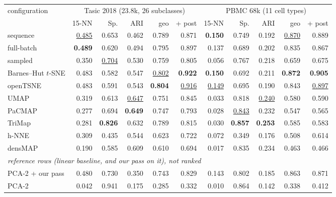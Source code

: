 \begin{tabular}{lrrrrrrrrrr}
\toprule
configuration & \multicolumn{5}{c}{Tasic 2018 (23.8k, 26 subclasses)} & \multicolumn{5}{c}{PBMC 68k (11 cell types)} \\
 & 15-NN & Sp. & ARI & geo & + post & 15-NN & Sp. & ARI & geo & + post \\
\midrule
\magnet{} sequence & \underline{0.485} & 0.653 & 0.462 & 0.789 & 0.871 & \textbf{0.150} & 0.749 & 0.192 & \underline{0.870} & 0.889 \\
\magnet{} full-batch & \textbf{0.489} & 0.620 & 0.494 & 0.795 & 0.897 & 0.137 & 0.689 & 0.202 & 0.835 & 0.867 \\
\magnet{} sampled & 0.350 & \underline{0.704} & 0.530 & 0.759 & 0.805 & 0.056 & 0.767 & 0.218 & 0.659 & 0.675 \\
Barnes--Hut $t$-SNE & 0.483 & 0.582 & 0.547 & \underline{0.802} & \textbf{0.922} & \textbf{0.150} & 0.692 & 0.211 & \textbf{0.872} & \textbf{0.905} \\
openTSNE & 0.483 & 0.591 & 0.543 & \textbf{0.804} & \underline{0.916} & \underline{0.149} & 0.695 & 0.190 & 0.843 & \underline{0.897} \\
UMAP & 0.319 & 0.613 & \underline{0.647} & 0.751 & 0.845 & 0.033 & 0.818 & \underline{0.240} & 0.580 & 0.590 \\
PaCMAP & 0.277 & 0.694 & \textbf{0.649} & 0.747 & 0.793 & 0.028 & \underline{0.843} & 0.232 & 0.547 & 0.565 \\
TriMap & 0.281 & \textbf{0.826} & 0.632 & 0.789 & 0.815 & 0.030 & \textbf{0.857} & \textbf{0.253} & 0.585 & 0.583 \\
h-NNE & 0.309 & 0.435 & 0.544 & 0.623 & 0.722 & 0.072 & 0.349 & 0.176 & 0.508 & 0.614 \\
densMAP & 0.190 & 0.585 & 0.609 & 0.610 & 0.694 & 0.017 & 0.835 & 0.234 & 0.463 & 0.466 \\
\midrule
\multicolumn{11}{l}{\emph{reference rows (linear baseline, and our pass on it), not ranked}} \\
PCA-2 + our pass & 0.480 & 0.730 & 0.350 & 0.743 & 0.829 & 0.143 & 0.802 & 0.185 & 0.863 & 0.871 \\
PCA-2 & 0.042 & 0.941 & 0.175 & 0.285 & 0.332 & 0.010 & 0.864 & 0.142 & 0.338 & 0.412 \\
\bottomrule
\end{tabular}
